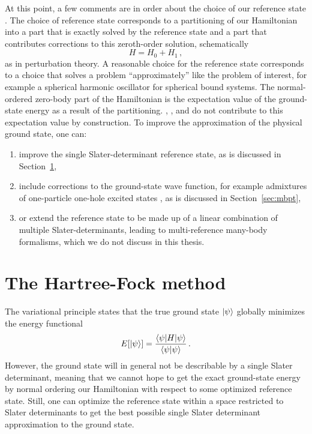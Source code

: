 At this point, a few comments are in order about the choice of our reference state .
The choice of reference state corresponds to a partitioning of our Hamiltonian
into a part that is exactly solved by the reference state
and a part that contributes corrections to this zeroth-order solution,
schematically
\begin{equation}
  H = H_0 + H_1\,,
\end{equation}
as in perturbation theory.
A reasonable choice for the reference state corresponds to a choice
that solves a problem ``approximately'' like the problem of interest,
for example a spherical harmonic oscillator for spherical bound systems.
The normal-ordered zero-body part of the Hamiltonian \hnozero{}
is the expectation value of the ground-state energy as a result of the partitioning.
\hnoone, \hnotwo, and \hnothree{} do not contribute to this expectation value by construction.
To improve the approximation of the physical ground state,
one can:
\begin{enumerate}
  \item improve the single Slater-determinant reference state,
        as is discussed in Section~\ref{sec:hartree_fock},
  \item include corrections to the ground-state wave function,
        for example admixtures of one-particle one-hole excited states ,
        as is discussed in Section~\ref{sec:mbpt},
  \item or extend the reference state to be made up of
        a linear combination of multiple Slater-determinants,
        leading to multi-reference many-body formalisms,
        which we do not discuss in this thesis.
\end{enumerate}

\section{The Hartree-Fock method}\label{sec:hartree_fock}

The variational principle states that the true ground state $\ket{\psi}$
globally minimizes the energy functional
\begin{equation}
  E[\ket{\psi}] = \frac{\braket{\psi | H | \psi}}{\braket{\psi|\psi}}\,.
\end{equation}
However, the ground state will in general not be describable by a single Slater determinant,
meaning that we cannot hope to get the exact ground-state energy
by normal ordering our Hamiltonian with respect to some optimized reference state.
Still, one can optimize the reference state
within a space restricted to Slater determinants
to get the best possible single Slater determinant approximation to the ground state.


